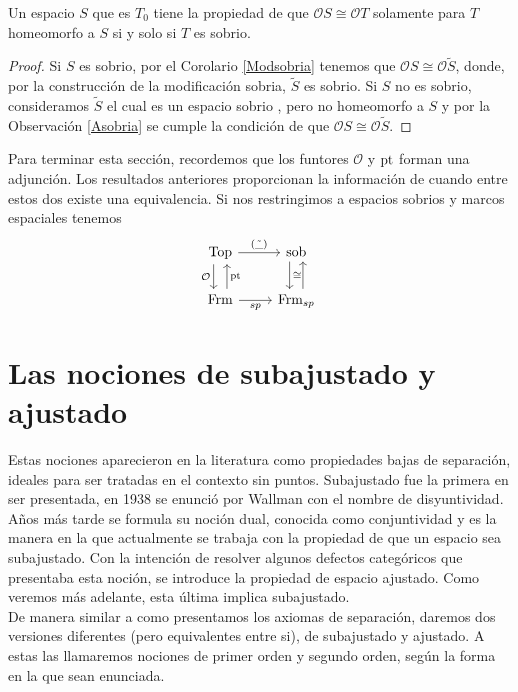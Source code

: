 \begin{prop}
    Un espacio $S$ que es $T_0$ tiene la propiedad de que $\mathcal{O}S\cong \mathcal{O}T$ solamente para $T$ homeomorfo a $S$ si y solo si $T$ es sobrio.
\end{prop}

\begin{proof}
    Si $S$ es sobrio, por el Corolario \ref{Modsobria} tenemos que $\mathcal{O}S\cong \mathcal{O}\tilde{S}$, donde, por la construcción de la modificación sobria, $\tilde{S}$ es sobrio. Si $S$ no es sobrio, consideramos $\tilde{S}$ el cual es un espacio sobrio , pero no homeomorfo a $S$ y por la Observación \ref{Asobria} se cumple la condición de que $\mathcal{O}S\cong \mathcal{O}\tilde{S}$.
\end{proof}

Para terminar esta sección, recordemos que los funtores $\mathcal{O}$ y $\mathrm{pt}$ forman una adjunción. Los resultados anteriores proporcionan la información de cuando entre estos dos existe una equivalencia. Si nos restringimos a espacios sobrios y marcos espaciales tenemos 
\[\begin{tikzcd}
	\Top & \sob \\
	\Frm & {\Frm_{sp}}
	\arrow["{\mathcal{O}}"', shift right=2, from=1-1, to=2-1]
	\arrow["\pt"', shift right=2, from=2-1, to=1-1]
	\arrow["{(\tilde{\_})}", from=1-1, to=1-2]
	\arrow["sp"', from=2-1, to=2-2]
	\arrow["\cong", shift right=2, from=1-2, to=2-2]
	\arrow[shift right=2, from=2-2, to=1-2]
\end{tikzcd}\]

\section{Las nociones de subajustado y ajustado}

Estas nociones aparecieron en la literatura como propiedades bajas de separación, ideales para ser tratadas en el contexto sin puntos. Subajustado fue la primera en ser presentada, en 1938 se enunció por Wallman con el nombre de disyuntividad. Años más tarde se formula su noción dual, conocida como conjuntividad y es la manera en la que actualmente se trabaja con la propiedad de que un espacio sea subajustado. Con la intención de resolver algunos defectos categóricos que presentaba esta noción, se introduce la propiedad de espacio ajustado. Como veremos más adelante, esta última implica subajustado.\\

De manera similar a como presentamos los axiomas de separación, daremos dos versiones diferentes (pero equivalentes entre si), de subajustado y ajustado. A estas las llamaremos nociones de primer orden y segundo orden, según la forma en la que sean enunciada. 

